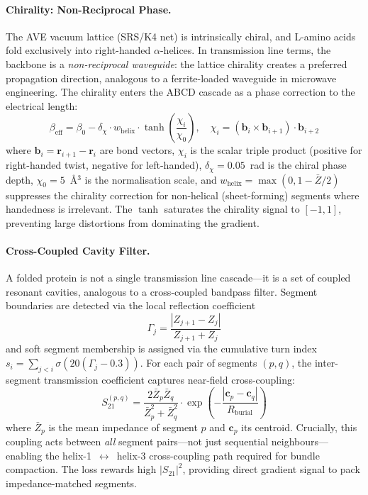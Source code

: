 \paragraph{Chirality: Non-Reciprocal Phase.}
The AVE vacuum lattice (SRS/K4 net) is intrinsically chiral, and L-amino acids fold exclusively into right-handed $\alpha$-helices. In transmission line terms, the backbone is a \emph{non-reciprocal waveguide}: the lattice chirality creates a preferred propagation direction, analogous to a ferrite-loaded waveguide in microwave engineering. The chirality enters the ABCD cascade as a phase correction to the electrical length:
\begin{equation}
    \beta_{\text{eff}} = \beta_0 - \delta_{\chi} \cdot w_{\text{helix}} \cdot \tanh\!\left(\frac{\chi_i}{\chi_0}\right), \quad \chi_i = (\mathbf{b}_{i} \times \mathbf{b}_{i+1}) \cdot \mathbf{b}_{i+2}
    \label{eq:chirality}
\end{equation}
where $\mathbf{b}_i = \mathbf{r}_{i+1} - \mathbf{r}_i$ are bond vectors, $\chi_i$ is the scalar triple product (positive for right-handed twist, negative for left-handed), $\delta_\chi = 0.05$~rad is the chiral phase depth, $\chi_0 = 5$~\AA$^3$ is the normalisation scale, and $w_{\text{helix}} = \max(0, 1 - \bar{Z}/2)$ suppresses the chirality correction for non-helical (sheet-forming) segments where handedness is irrelevant. The $\tanh$ saturates the chirality signal to $[-1, 1]$, preventing large distortions from dominating the gradient.

\paragraph{Cross-Coupled Cavity Filter.}
A folded protein is not a single transmission line cascade---it is a set of coupled resonant cavities, analogous to a cross-coupled bandpass filter.  Segment boundaries are detected via the local reflection coefficient
\begin{equation}
    \Gamma_j = \frac{|Z_{j+1} - Z_j|}{Z_{j+1} + Z_j}
    \label{eq:segment_boundary}
\end{equation}
and soft segment membership is assigned via the cumulative turn index $s_i = \sum_{j<i} \sigma(20(\Gamma_j - 0.3))$.  For each pair of segments $(p, q)$, the inter-segment transmission coefficient captures near-field cross-coupling:
\begin{equation}
    S_{21}^{(p,q)} = \frac{2\bar{Z}_p \bar{Z}_q}{\bar{Z}_p^2 + \bar{Z}_q^2} \cdot \exp\!\left(-\frac{|\mathbf{c}_p - \mathbf{c}_q|}{R_{\text{burial}}}\right)
    \label{eq:cross_coupling}
\end{equation}
where $\bar{Z}_p$ is the mean impedance of segment $p$ and $\mathbf{c}_p$ its centroid.  Crucially, this coupling acts between \emph{all} segment pairs---not just sequential neighbours---enabling the helix-1~$\leftrightarrow$~helix-3 cross-coupling path required for bundle compaction.  The loss rewards high $|S_{21}|^2$, providing direct gradient signal to pack impedance-matched segments.

